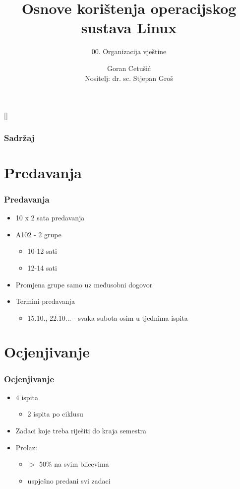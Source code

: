 \documentclass{beamer}
\title{Osnove korištenja operacijskog sustava Linux}
\subtitle{00. Organizacija vještine}
\author[Goran Cetušić]{Goran Cetušić\\{\small Nositelj: dr. sc. Stjepan Groš}}
\institute[FER]{Sveučilište u Zagrebu \\
				Fakultet elektrotehnike i računarstva}
\date{\todayiso}
\begin{document}
{
[] %

\begin{frame}
\maketitle
\end{frame}
}

\begin{frame}
\frametitle{Sadržaj}
\tableofcontents
\end{frame}

\section{Predavanja}
\begin{frame}[t]
\frametitle{Predavanja}
\begin{itemize}
	\item 10 x 2 sata predavanja
	\item A102 - 2 grupe
	\begin{itemize}
		\item 10-12 sati
		\item 12-14 sati
	\end{itemize}
	\item Promjena grupe samo uz međusobni dogovor
	\item Termini predavanja
	\begin{itemize}
		\item 15.10., 22.10... - svaka subota osim u tjednima ispita
	\end{itemize}
\end{itemize}
\end{frame}

\section{Ocjenjivanje}
\begin{frame}[t]
\frametitle{Ocjenjivanje}
\begin{itemize}
	\item 4 ispita
	\begin{itemize}
		\item 2 ispita po ciklusu
	\end{itemize}
	\item Zadaci koje treba riješiti do kraja semestra
	\item Prolaz:
	\begin{itemize}
		\item $>$ 50\% na svim blicevima
		\item uspješno predani svi zadaci
	\end{itemize}
\end{itemize}
\end{frame}
\end{document}
